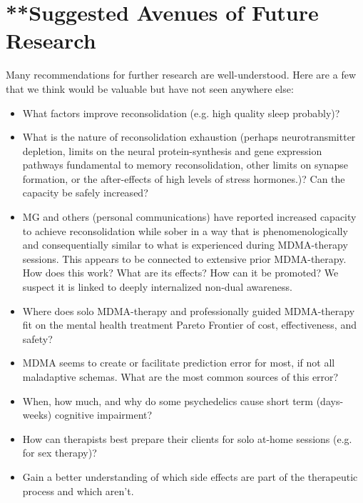 \documentclass[12pt,letterpaper]{book}
\begin{document}
\chapter{**Suggested Avenues of Future Research}
Many recommendations for further research are well-understood. Here are a few that we think would be valuable but have not seen anywhere else:
\begin{itemize}
    \item What factors improve reconsolidation (e.g. high quality sleep probably)?
    \item What is the nature of reconsolidation exhaustion (perhaps neurotransmitter depletion, limits on the neural protein-synthesis and gene expression pathways fundamental to memory reconsolidation, other limits on synapse formation, or the after-effects of high levels of stress hormones.)? Can the capacity be safely increased?
    \item MG and others (personal communications) have reported increased capacity to achieve reconsolidation while sober in a way that is phenomenologically and consequentially similar to what is experienced during MDMA-therapy sessions. This appears to be connected to extensive prior MDMA-therapy. How does this work? What are its effects? How can it be promoted? We suspect it is linked to deeply internalized non-dual awareness.
    \item Where does solo MDMA-therapy and professionally guided MDMA-therapy fit on the mental health treatment Pareto Frontier of cost, effectiveness, and safety?
    \item MDMA seems to create or facilitate prediction error for most, if not all maladaptive schemas. What are the most common sources of this error?
    \item When, how much, and why do some psychedelics cause short term (days-weeks) cognitive impairment?
    \item How can therapists best prepare their clients for solo at-home sessions (e.g. for sex therapy)?
    \item Gain a better understanding of which side effects are part of the therapeutic process and which aren't.
\end{itemize}
\backmatter
\printbibliography
{}
\end{document}
